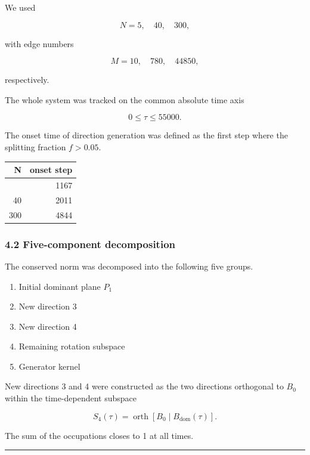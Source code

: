 \documentclass[
  a4paper,
]{article}
\newcounter{none} %
\providecommand{\tightlist}{%
  \setlength{\itemsep}{0pt}\setlength{\parskip}{0pt}}
\begin{document}
We used

\[
N=5,\quad40,\quad300 ,
\]

with edge numbers

\[
M=10,\quad780,\quad44850 ,
\]

respectively.

The whole system was tracked on the common absolute time axis

\[
0\le\tau\le55000 .
\]

The onset time of direction generation was defined as the first step
where the splitting fraction \(f>0.05\).

{\def\LTcaptype{none} %
\begin{longtable}[]{@{}rr@{}}
\toprule\noalign{}
N & onset step \\
\midrule\noalign{}
\endhead
\bottomrule\noalign{}
\endlastfoot
5 & 1167 \\
40 & 2011 \\
300 & 4844 \\
\end{longtable}
}

\subsubsection{4.2 Five-component
decomposition}\label{five-component-decomposition}

The conserved norm was decomposed into the following five groups.

\begin{enumerate}
\def\labelenumi{\arabic{enumi}.}
\tightlist
\item
  Initial dominant plane \(P_1\)
\item
  New direction 3
\item
  New direction 4
\item
  Remaining rotation subspace
\item
  Generator kernel
\end{enumerate}

New directions 3 and 4 were constructed as the two directions orthogonal
to \(B_0\) within the time-dependent subspace

\[
S_4(\tau)=\operatorname{orth}[B_0\mid B_{\mathrm{dom}}(\tau)] .
\]

The sum of the occupations closes to 1 at all times.

\begin{center}\rule{0.5\linewidth}{0.5pt}\end{center}
\end{document}
